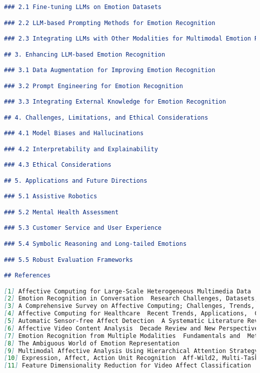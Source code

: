 \begin{lstlisting}[language=markdown,style=markdownstyle]
### 2.1 Fine-tuning LLMs on Emotion Datasets

### 2.2 LLM-based Prompting Methods for Emotion Recognition

### 2.3 Integrating LLMs with Other Modalities for Multimodal Emotion Recognition

## 3. Enhancing LLM-based Emotion Recognition

### 3.1 Data Augmentation for Improving Emotion Recognition

### 3.2 Prompt Engineering for Emotion Recognition

### 3.3 Integrating External Knowledge for Emotion Recognition

## 4. Challenges, Limitations, and Ethical Considerations

### 4.1 Model Biases and Hallucinations

### 4.2 Interpretability and Explainability

### 4.3 Ethical Considerations

## 5. Applications and Future Directions

### 5.1 Assistive Robotics

### 5.2 Mental Health Assessment

### 5.3 Customer Service and User Experience

### 5.4 Symbolic Reasoning and Long-tailed Emotions

### 5.5 Robust Evaluation Frameworks

## References

[1] Affective Computing for Large-Scale Heterogeneous Multimedia Data  A  Survey
[2] Emotion Recognition in Conversation  Research Challenges, Datasets, and  Recent Advances
[3] A Comprehensive Survey on Affective Computing; Challenges, Trends,  Applications, and Future Directions
[4] Affective Computing for Healthcare  Recent Trends, Applications,  Challenges, and Beyond
[5] Automatic Sensor-free Affect Detection  A Systematic Literature Review
[6] Affective Video Content Analysis  Decade Review and New Perspectives
[7] Emotion Recognition from Multiple Modalities  Fundamentals and  Methodologies
[8] The Ambiguous World of Emotion Representation
[9] Multimodal Affective Analysis Using Hierarchical Attention Strategy with  Word-Level Alignment
[10] Expression, Affect, Action Unit Recognition  Aff-Wild2, Multi-Task  Learning and ArcFace
[11] Feature Dimensionality Reduction for Video Affect Classification  A  Comparative Study

\end{lstlisting}

